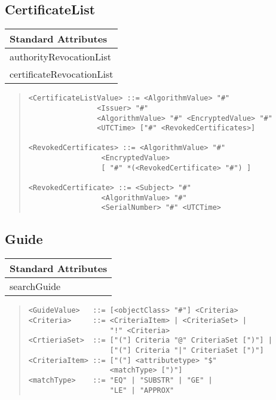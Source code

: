\subsection{CertificateList}
\begin{center}\small
\begin{tabular}{|l|}\hline
Standard Attributes \\ \hline
	authorityRevocationList\\
	certificateRevocationList\\
\hline
\end{tabular}
\end{center}

\begin{quote}\begin{verbatim}
<CertificateListValue> ::= <AlgorithmValue> "#" 
                <Issuer> "#" 
                <AlgorithmValue> "#" <EncryptedValue> "#"
                <UTCTime> ["#" <RevokedCertificates>]

<RevokedCertificates> ::= <AlgorithmValue> "#"
                 <EncryptedValue> 
                 [ "#" *(<RevokedCertificate> "#") ]

<RevokedCertificate> ::= <Subject> "#" 
                 <AlgorithmValue> "#"
                 <SerialNumber> "#" <UTCTime>

\end{verbatim}\end{quote}

\subsection{Guide}
\begin{center}\small
\begin{tabular}{|l|}\hline
Standard Attributes \\ \hline
	searchGuide\\
\hline
\end{tabular}
\end{center}

\begin{quote}\begin{verbatim}
<GuideValue>   ::= [<objectClass> "#"] <Criteria>
<Criteria>     ::= <CriteriaItem> | <CriteriaSet> | 
                   "!" <Criteria>
<CrtieriaSet>  ::= ["("] Criteria "@" CriteriaSet [")"] | 
                   ["("] Criteria "|" CriteriaSet [")"]
<CriteriaItem> ::= ["("] <attributetype> "$" 
                   <matchType> [")"]
<matchType>    ::= "EQ" | "SUBSTR" | "GE" | 
                   "LE" | "APPROX"
\end{verbatim}\end{quote}

